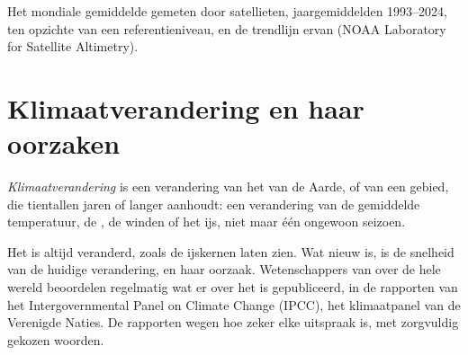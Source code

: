 \begin{omfigure}

{\small Het mondiale gemiddelde  gemeten door satellieten,
jaargemiddelden 1993--2024, ten opzichte van een referentieniveau, en de
trendlijn ervan (NOAA Laboratory for Satellite Altimetry).}
\label{fig:g9:climate-past-and-present:sea}
\end{omfigure}

\section{Klimaatverandering en haar oorzaken}

\begin{definition}[Klimaatverandering]\label{def:g9:climate-past-and-present:climate-change}
\emph{Klimaatverandering} is een verandering van
het  van de Aarde, of van een gebied, die tientallen jaren of
langer aanhoudt: een verandering van de gemiddelde temperatuur, de ,
de winden of het ijs, niet maar één ongewoon seizoen.
\end{definition}

Het  is altijd veranderd, zoals de ijskernen laten zien. Wat nieuw
is, is de snelheid van de huidige verandering, en haar oorzaak.
Wetenschappers van over de hele wereld beoordelen regelmatig wat er over
het  is gepubliceerd, in de rapporten van het Intergovernmental
Panel on Climate Change (IPCC), het klimaatpanel van de Verenigde Naties.
De rapporten wegen hoe zeker elke uitspraak is, met zorgvuldig gekozen
woorden.

